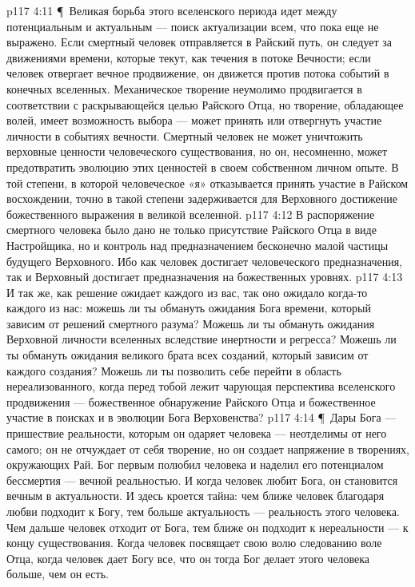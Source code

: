 \vs p117 4:11 \P\ Великая борьба этого вселенского периода идет между потенциальным и актуальным --- поиск актуализации всем, что пока еще не выражено. Если смертный человек отправляется в Райский путь, он следует за движениями времени, которые текут, как течения в потоке Вечности; если человек отвергает вечное продвижение, он движется против потока событий в конечных вселенных. Механическое творение неумолимо продвигается в соответствии с раскрывающейся целью Райского Отца, но творение, обладающее волей, имеет возможность выбора --- может принять или отвергнуть участие личности в событиях вечности. Смертный человек не может уничтожить верховные ценности человеческого существования, но он, несомненно, может предотвратить эволюцию этих ценностей в своем собственном личном опыте. В той степени, в которой человеческое «я» отказывается принять участие в Райском восхождении, точно в такой степени задерживается для Верховного достижение божественного выражения в великой вселенной.
\vs p117 4:12 В распоряжение смертного человека было дано не только присутствие Райского Отца в виде Настройщика, но и контроль над предназначением бесконечно малой частицы будущего Верховного. Ибо как человек достигает человеческого предназначения, так и Верховный достигает предназначения на божественных уровнях.
\vs p117 4:13 И так же, как решение ожидает каждого из вас, так оно ожидало когда\hyp{}то каждого из нас: можешь ли ты обмануть ожидания Бога времени, который зависим от решений смертного разума? Можешь ли ты обмануть ожидания Верховной личности вселенных вследствие инертности и регресса? Можешь ли ты обмануть ожидания великого брата всех созданий, который зависим от каждого создания? Можешь ли ты позволить себе перейти в область нереализованного, когда перед тобой лежит чарующая перспектива вселенского продвижения --- божественное обнаружение Райского Отца и божественное участие в поисках и в эволюции Бога Верховенства?
\vs p117 4:14 \P\ Дары Бога --- пришествие реальности, которым он одаряет человека --- неотделимы от него самого; он не отчуждает от себя творение, но он создает напряжение в творениях, окружающих Рай. Бог первым полюбил человека и наделил его потенциалом бессмертия --- вечной реальностью. И когда человек любит Бога, он становится вечным в актуальности. И здесь кроется тайна: чем ближе человек благодаря любви подходит к Богу, тем больше актуальность --- реальность этого человека. Чем дальше человек отходит от Бога, тем ближе он подходит к нереальности --- к концу существования. Когда человек посвящает свою волю следованию воле Отца, когда человек дает Богу все, что он  тогда Бог делает этого человека больше, чем он есть.
